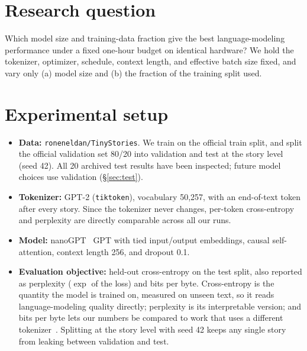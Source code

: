 \documentclass[12pt]{article}
\begin{document}
\section{Research question}
Which model size and training-data fraction give the best language-modeling
performance under a fixed one-hour budget on identical hardware? We hold the
tokenizer, optimizer, schedule, context length, and effective batch size fixed, and
vary only (a) model size and (b) the fraction of the training split used.

\section{Experimental setup}
\begin{itemize}
  \item \textbf{Data:} \texttt{roneneldan/TinyStories}. We train on the official
        train split, and split the official validation set 80/20 into validation and
        test at the story level (seed 42). All 20 archived test results have been inspected;
        future model choices use validation (\S\ref{sec:test}).
  \item \textbf{Tokenizer:} GPT-2 (\texttt{tiktoken}), vocabulary 50{,}257, with an
        end-of-text token after every story. Since the tokenizer never changes,
        per-token cross-entropy and perplexity are directly comparable across all our
        runs.
  \item \textbf{Model:} nanoGPT~\cite{karpathy} GPT with tied input/output
        embeddings, causal self-attention, context length 256, and dropout 0.1.
  \item \textbf{Evaluation objective:} held-out cross-entropy on the test split,
        also reported as perplexity ($\exp$ of the loss) and bits per byte.
        Cross-entropy is the quantity the model is trained on, measured on unseen
        text, so it reads language-modeling quality directly; perplexity is its
        interpretable version; and bits per byte lets our numbers be compared to work
        that uses a different tokenizer~\cite{eldan2023}. Splitting at the story level
        with seed 42 keeps any single story from leaking between validation and test.
\end{itemize}
\end{document}
